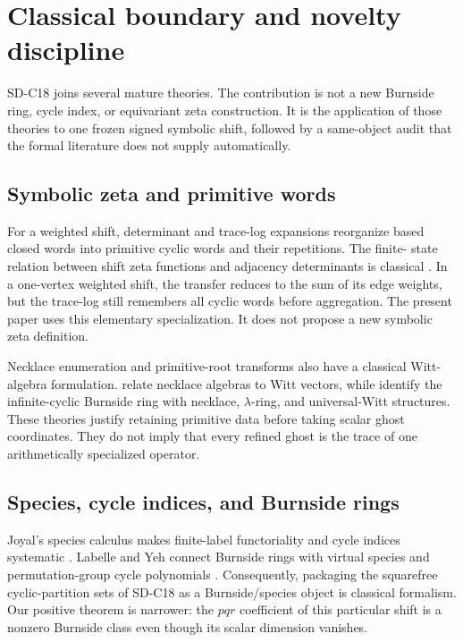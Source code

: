 \section{Classical boundary and novelty discipline}
\label{sec:boundary}

SD-C18 joins several mature theories.  The contribution is not a new
Burnside ring, cycle index, or equivariant zeta construction.  It is the
application of those theories to one frozen signed symbolic shift, followed
by a same-object audit that the formal literature does not supply
automatically.

\subsection{Symbolic zeta and primitive words}

For a weighted shift, determinant and trace-log expansions reorganize based
closed words into primitive cyclic words and their repetitions.  The finite-
state relation between shift zeta functions and adjacency determinants is
classical \citep{BowenLanford1970ShiftZeta}.  In a one-vertex weighted shift,
the transfer reduces to the sum of its edge weights, but the trace-log still
remembers all cyclic words before aggregation.  The present paper uses this
elementary specialization.  It does not propose a new symbolic zeta
definition.

Necklace enumeration and primitive-root transforms also have a classical
Witt-algebra formulation.  \citet{MetropolisRota1983Necklaces} relate
necklace algebras to Witt vectors, while
\citet{DressSiebeneicher1989NecklaceWitt} identify the infinite-cyclic
Burnside ring with necklace, $\lambda$-ring, and universal-Witt structures.
These theories justify retaining primitive data before taking scalar ghost
coordinates.  They do not imply that every refined ghost is the trace of one
arithmetically specialized operator.

\subsection{Species, cycle indices, and Burnside rings}

Joyal's species calculus makes finite-label functoriality and cycle indices
systematic \citep{Joyal1981Species}.  Labelle and Yeh connect Burnside rings
with virtual species and permutation-group cycle polynomials
\citep{LabelleYeh1989BurnsideSpecies}.  Consequently, packaging the
squarefree cyclic-partition sets of SD-C18 as a Burnside/species object is
classical formalism.  Our positive theorem is narrower: the $pqr$ coefficient
of this particular shift is a nonzero Burnside class even though its scalar
dimension vanishes.

